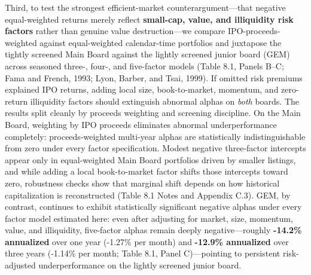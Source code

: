 \documentclass[11pt,letterpaper]{article}
\begin{document}
Third, to test the strongest efficient-market counterargument—that negative equal-weighted returns merely reflect \textbf{small-cap, value, and illiquidity risk factors} rather than genuine value destruction—we compare IPO-proceeds-weighted against equal-weighted calendar-time portfolios and juxtapose the tightly screened Main Board against the lightly screened junior board (GEM) across seasoned three-, four-, and five-factor models (Table 8.1, Panels B–C; Fama and French, 1993; Lyon, Barber, and Tsai, 1999). If omitted risk premiums explained IPO returns, adding local size, book-to-market, momentum, and zero-return illiquidity factors should extinguish abnormal alphas on \textit{both} boards. The results split cleanly by proceeds weighting and screening discipline. On the Main Board, weighting by IPO proceeds eliminates abnormal underperformance completely: proceeds-weighted multi-year alphas are statistically indistinguishable from zero under every factor specification. Modest negative three-factor intercepts appear only in equal-weighted Main Board portfolios driven by smaller listings, and while adding a local book-to-market factor shifts those intercepts toward zero, robustness checks show that marginal shift depends on how historical capitalization is reconstructed (Table 8.1 Notes and Appendix C.3). GEM, by contrast, continues to exhibit statistically significant negative alphas under every factor model estimated here: even after adjusting for market, size, momentum, value, and illiquidity, five-factor alphas remain deeply negative—roughly \textbf{-14.2\% annualized} over one year (-1.27\% per month) and \textbf{-12.9\% annualized} over three years (-1.14\% per month; Table 8.1, Panel C)—pointing to persistent risk-adjusted underperformance on the lightly screened junior board.
\end{document}
